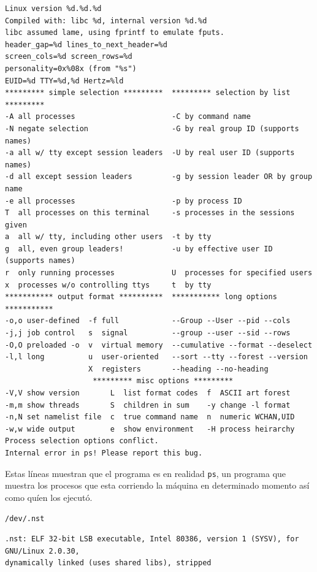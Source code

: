 \begin{lstlisting}[style=terminal]
Linux version %d.%d.%d
Compiled with: libc %d, internal version %d.%d
libc assumed lame, using fprintf to emulate fputs.
header_gap=%d lines_to_next_header=%d
screen_cols=%d screen_rows=%d
personality=0x%08x (from "%s")
EUID=%d TTY=%d,%d Hertz=%ld
********* simple selection *********  ********* selection by list *********
-A all processes                      -C by command name
-N negate selection                   -G by real group ID (supports names)
-a all w/ tty except session leaders  -U by real user ID (supports names)
-d all except session leaders         -g by session leader OR by group name
-e all processes                      -p by process ID
T  all processes on this terminal     -s processes in the sessions given
a  all w/ tty, including other users  -t by tty
g  all, even group leaders!           -u by effective user ID (supports names)
r  only running processes             U  processes for specified users
x  processes w/o controlling ttys     t  by tty
*********** output format **********  *********** long options ***********
-o,o user-defined  -f full            --Group --User --pid --cols
-j,j job control   s  signal          --group --user --sid --rows
-O,O preloaded -o  v  virtual memory  --cumulative --format --deselect
-l,l long          u  user-oriented   --sort --tty --forest --version
                   X  registers       --heading --no-heading
                    ********* misc options *********
-V,V show version       L  list format codes  f  ASCII art forest
-m,m show threads       S  children in sum    -y change -l format
-n,N set namelist file  c  true command name  n  numeric WCHAN,UID
-w,w wide output        e  show environment   -H process heirarchy
Process selection options conflict.
Internal error in ps! Please report this bug.
\end{lstlisting}

\vspace{1em}

Estas líneas muestran que el programa es en realidad \texttt{ps}, un programa
que muestra los procesos que esta corriendo la máquina en determinado
momento así como quíen los ejecutó.



\texttt{/dev/.nst}

\vspace{1em}

\begin{lstlisting}[style=terminal]
.nst: ELF 32-bit LSB executable, Intel 80386, version 1 (SYSV), for GNU/Linux 2.0.30, 
dynamically linked (uses shared libs), stripped
\end{lstlisting}


